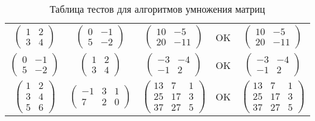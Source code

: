 \begin{table}[H]
\begin{tabular}{|c|c|c|c|c|}
        $\left( \begin{matrix} 1 & 2 \\ 3 & 4 \end{matrix} \right)$ & $\left( \begin{matrix} 0 & -1 \\ 5 & -2 \end{matrix} \right)$ & $\left( \begin{matrix} 10 & -5 \\ 20 & -11 \end{matrix} \right)$ & OK & $\left( \begin{matrix} 10 & -5 \\ 20 & -11 \end{matrix} \right)$ \\
        $\left( \begin{matrix} 0 & -1 \\ 5 & -2 \end{matrix} \right)$ & $\left( \begin{matrix} 1 & 2 \\ 3 & 4 \end{matrix} \right)$ & $\left( \begin{matrix} -3 & -4 \\ -1 & 2 \end{matrix} \right)$ & OK & $\left( \begin{matrix} -3 & -4 \\ -1 & 2 \end{matrix} \right)$ \\
        $\left( \begin{matrix} 1 & 2 \\ 3 & 4 \\ 5 & 6 \end{matrix} \right)$ & $\left( \begin{matrix} -1 & 3 & 1 \\ 7 & 2 & 0 \end{matrix} \right)$ & $\left( \begin{matrix} 13 & 7 & 1 \\ 25 & 17 & 3 \\ 37 & 27 & 5 \end{matrix} \right)$ & OK & $\left( \begin{matrix} 13 & 7 & 1 \\ 25 & 17 & 3 \\ 37 & 27 & 5 \end{matrix} \right)$ \\
        \hline
    \end{tabular}
    \caption{Таблица тестов для алгоритмов умножения матриц}
    \label{table:tests}
\end{table}

